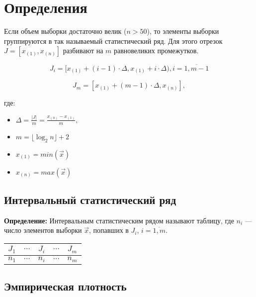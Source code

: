 \chapter{Определения}

Если объем выборки достаточно велик ($n > 50$), то элементы выборки группируются в так называемый статистический ряд. Для этого отрезок\newline $J = [x_{(1)}, x_{(n)}]$ разбивают на $m$ равновеликих промежутков.\newline

$$ J_i = [x_{(1)} + (i - 1) \cdot \Delta, x_{(1)} + i \cdot \Delta), i = \overline{1, m - 1} $$

$$ J_{m} = [x_{(1)} + (m - 1) \cdot \Delta, x_{(n)}], $$

где:

\begin{itemize}[label = ---]
    \item $ \Delta = \frac{|J|}{m} = \frac{x_{(n)} - x_{(1)}}{m}, $
    \item $m = \lfloor \log_2 n \rfloor + 2$
    \item $x_{(1)} = min(\vec x)$
    \item $x_{(n)} = max(\vec x)$
\end{itemize}

\section{Интервальный статистический ряд}

\textbf{Определение:} Интервальным статистическим рядом называют таблицу, где $n_i$ --- число элементов выборки $\vec x$, попавших в $J_i$, $i = \overline{1, m}$.

\begin{table}[htb]
    \centering
    \begin{tabular}{|c|c|c|c|c|}
        \hline
        $J_1$ & $\cdots$ & $J_i$ & $\cdots$ & $J_m$ \\
        \hline
        $n_1$ & $\cdots$ & $n_i$ & $\cdots$ & $n_m$ \\
        \hline
    \end{tabular}
\end{table}

\clearpage

\section{Эмпирическая плотность}

